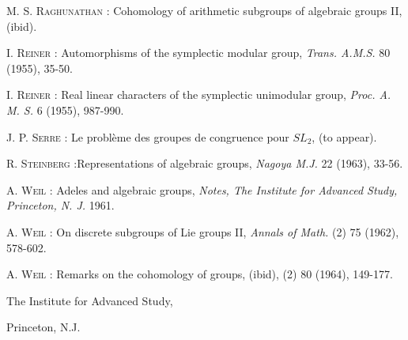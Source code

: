 \begin{thebibliography}{99}
 \textsc{M. S. Raghunathan :} Cohomology of arithmetic subgroups of algebraic groups II, (ibid).

 \textsc{I. Reiner :} Automorphisms of the symplectic modular group, {\em Trans. A.M.S.} 80 (1955), 35-50.

 \textsc{I. Reiner :} Real linear characters of the symplectic unimodular group, {\em Proc. A. M. S.} 6 (1955), 987-990.

 \textsc{J. P. Serre :} Le probl\`eme des groupes de congruence pour $SL_{2}$, (to appear).

 \textsc{R. Steinberg :}\pageoriginale Representations of algebraic groups, {\em Nagoya M.J.} 22 (1963), 33-56.

 \textsc{A. Weil :} Adeles and algebraic groups, {\em Notes, The Institute for Advanced Study, Princeton, N. J.} 1961.

 \textsc{A. Weil :} On discrete subgroups of Lie groups II, {\em Annals of Math.} (2) 75 (1962), 578-602.

 \textsc{A. Weil :} Remarks on the cohomology of groups, (ibid), (2) 80 (1964), 149-177.

\end{thebibliography}

\medskip
\noindent
The Institute for Advanced Study,

\noindent
Princeton, N.J.
